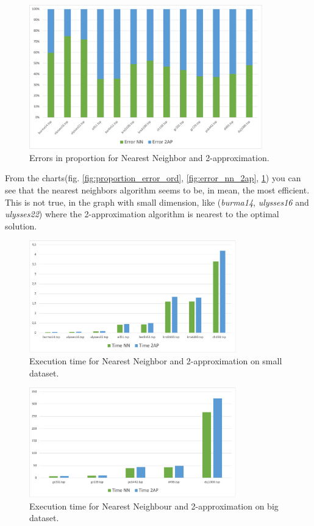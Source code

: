 \begin{figure}[H]
    \centering
    \includegraphics[width=0.9\textwidth]{./img/error_nn_2ap_prop.png}
    \caption{Errors in proportion for Nearest Neighbor and 2-approximation.}
    \label{fig:error_nn_2ap_prop}
\end{figure}
From the charts(fig. \ref{fig:proportion_error_ord}, \ref{fig:error_nn_2ap}, \ref{fig:error_nn_2ap_prop}) you can see that the nearest neighbors algorithm seems to be, in mean, the most efficient. This is not true, in the graph with small dimension, like (\textit{burma14}, \textit{ulysses16} and \textit{ulysses22}) where the 2-approximation algorithm is nearest to the optimal solution.

\begin{figure}[H]
    \centering
    \includegraphics[width=0.8\textwidth]{./img/time_nn_2ap_small.png}
    \caption{Execution time for Nearest Neighbor and 2-approximation on small dataset.}
    \label{fig:time_nn_2ap_small}
\end{figure}
\begin{figure}[H]
    \centering
    \includegraphics[width=0.8\textwidth]{./img/time_nn_2ap_big.png}
    \caption{Execution time for Nearest Neighbour and 2-approximation on big dataset.}
    \label{fig:time_nn_2ap_big}
\end{figure}